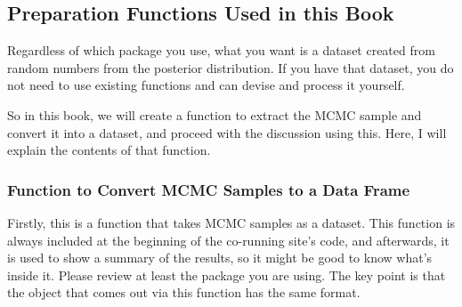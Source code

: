 \documentclass{ltjsbook}
\begin{document}
\subsection{Preparation Functions Used in this Book}
\label{preparedFunctions}
Regardless of which package you use, what you want is a dataset created from random numbers from the posterior distribution. If you have that dataset, you do not need to use existing functions and can devise and process it yourself.

So in this book, we will create a function to extract the MCMC sample and convert it into a dataset, and proceed with the discussion using this.
Here, I will explain the contents of that function.
\subsubsection{Function to Convert MCMC Samples to a Data Frame}
Firstly, this is a function that takes MCMC samples as a dataset. This function is always included at the beginning of the co-running site's code, and afterwards, it is used to show a summary of the results, so it might be good to know what's inside it. Please review at least the package you are using. The key point is that the object that comes out via this function has the same format.

\end{document}
